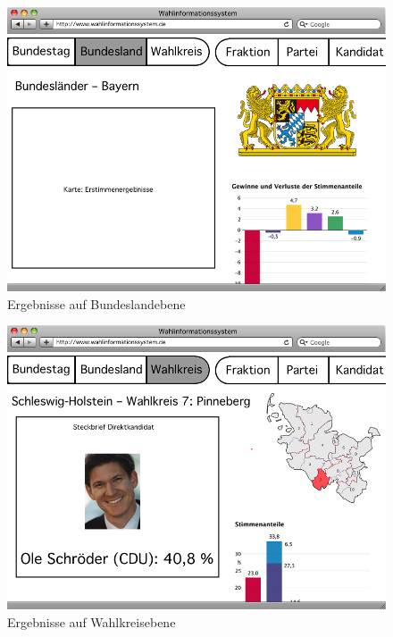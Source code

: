 \documentclass[a4paper]{article}
\begin{document}
\begin{figure}[h!]
\centering
\includegraphics[scale=0.4]{Mockups/bundesland}
\caption{Ergebnisse auf Bundeslandebene}
\end{figure}

\begin{figure}[h!]
\centering
\includegraphics[scale=0.4]{Mockups/wahlkreis}
\caption{Ergebnisse auf Wahlkreisebene}
\end{figure}
\end{document}
